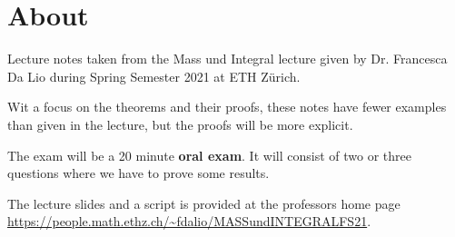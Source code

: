 \section*{About}

Lecture notes taken from the Mass und Integral lecture given by Dr. Francesca Da Lio during Spring Semester 2021 at ETH Zürich.

Wit a focus on the theorems and their proofs,
these notes have fewer examples than given in the lecture, but the proofs will be more explicit.

The exam will be a 20 minute \textbf{oral exam}. It will consist of two or three questions where we have to prove some results.

The lecture slides and a script is provided at the professors home page \url{https://people.math.ethz.ch/~fdalio/MASSundINTEGRALFS21}.


